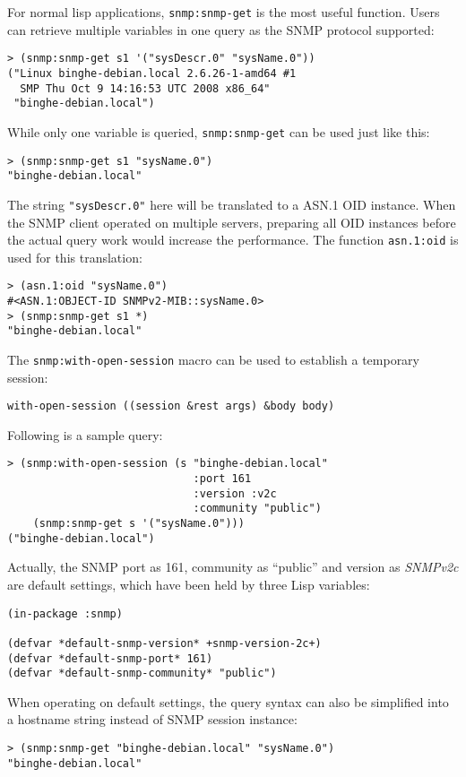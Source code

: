\documentclass[reprint,natbib,9pt]{sigplanconf}
\begin{document}
For normal lisp applications, \texttt{snmp:snmp-get} is the most
useful function. Users can retrieve multiple variables in one query as
the SNMP protocol supported:
%
\begin{verbatim}
> (snmp:snmp-get s1 '("sysDescr.0" "sysName.0"))
("Linux binghe-debian.local 2.6.26-1-amd64 #1
  SMP Thu Oct 9 14:16:53 UTC 2008 x86_64"
 "binghe-debian.local")
\end{verbatim}
%
While only one variable is queried, \texttt{snmp:snmp-get} can be used
just like this:
%
\begin{verbatim}
> (snmp:snmp-get s1 "sysName.0")
"binghe-debian.local"
\end{verbatim}

The string \texttt{"sysDescr.0"} here will be translated to a
ASN.1 OID instance. When the SNMP client operated on
multiple servers, preparing all OID instances before the actual query work
would increase the performance. The function \texttt{asn.1:oid} is used for
this translation:
%
\begin{verbatim}
> (asn.1:oid "sysName.0")
#<ASN.1:OBJECT-ID SNMPv2-MIB::sysName.0>
> (snmp:snmp-get s1 *)
"binghe-debian.local"
\end{verbatim}

The \texttt{snmp:with-open-session} macro can be used to establish a
temporary session:
\begin{verbatim}
with-open-session ((session &rest args) &body body)
\end{verbatim}
Following is a sample query:
\begin{verbatim}
> (snmp:with-open-session (s "binghe-debian.local"
                             :port 161
                             :version :v2c
                             :community "public")
    (snmp:snmp-get s '("sysName.0")))
("binghe-debian.local")
\end{verbatim}
Actually, the SNMP port as 161, community as ``public'' and version as
\textsl{SNMPv2c} are default settings, which have been held by three
Lisp variables:
%
\begin{verbatim}
(in-package :snmp)

(defvar *default-snmp-version* +snmp-version-2c+)
(defvar *default-snmp-port* 161)
(defvar *default-snmp-community* "public")
\end{verbatim}

When operating on default settings, the query syntax can also be
simplified into a hostname string instead of SNMP session instance:
%
\begin{verbatim}
> (snmp:snmp-get "binghe-debian.local" "sysName.0")
"binghe-debian.local"
\end{verbatim}
\end{document}
